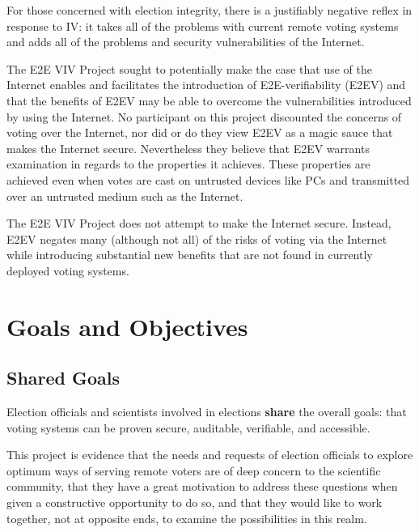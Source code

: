 For those concerned with election integrity, there is a justifiably
negative reflex in response to IV: it takes all of the problems with
current remote voting systems and adds all of the problems and
security vulnerabilities of the Internet.  

The E2E VIV Project sought to potentially make the case that use of
the Internet enables and facilitates the introduction of
E2E-verifiability (E2EV) and that the benefits of E2EV may be able to
overcome the vulnerabilities introduced by using the Internet. No
participant on this project discounted the concerns of voting over the
Internet, nor did or do they view E2EV as a magic sauce that makes the
Internet secure. Nevertheless they believe that E2EV warrants
examination in regards to the properties it achieves. These properties
are achieved even when votes are cast on untrusted devices like PCs
and transmitted over an untrusted medium such as the Internet.

The E2E VIV Project does not attempt to make the Internet
secure. Instead, E2EV negates many (although not all) of the risks of
voting via the Internet while introducing substantial new benefits
that are not found in currently deployed voting systems.

\section{Goals and Objectives}

\subsection{Shared Goals}

Election officials and scientists involved in elections \textbf{share}
the overall goals: that voting systems can be proven secure,
auditable, verifiable, and accessible.

This project is evidence that the needs and requests of election
officials to explore optimum ways of serving remote voters are of deep
concern to the scientific community, that they have a great motivation
to address these questions when given a constructive opportunity to do
so, and that they would like to work together, not at opposite ends,
to examine the possibilities in this realm.

